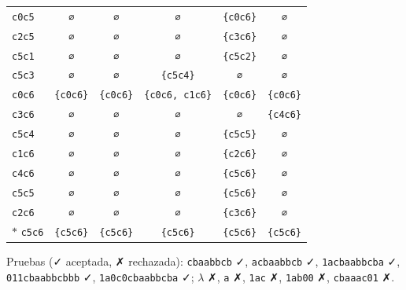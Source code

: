 \documentclass[11pt]{article}
\begin{document}
\begin{center}
\begin{tabular}{lccccc}
 \texttt{c0c5} & \texttt{∅} & \texttt{∅} & \texttt{∅} & \texttt{\{c0c6\}} & \texttt{∅} \\
 \texttt{c2c5} & \texttt{∅} & \texttt{∅} & \texttt{∅} & \texttt{\{c3c6\}} & \texttt{∅} \\
 \texttt{c5c1} & \texttt{∅} & \texttt{∅} & \texttt{∅} & \texttt{\{c5c2\}} & \texttt{∅} \\
 \texttt{c5c3} & \texttt{∅} & \texttt{∅} & \texttt{\{c5c4\}} & \texttt{∅} & \texttt{∅} \\
 \texttt{c0c6} & \texttt{\{c0c6\}} & \texttt{\{c0c6\}} & \texttt{\{c0c6, c1c6\}} & \texttt{\{c0c6\}} & \texttt{\{c0c6\}} \\
 \texttt{c3c6} & \texttt{∅} & \texttt{∅} & \texttt{∅} & \texttt{∅} & \texttt{\{c4c6\}} \\
 \texttt{c5c4} & \texttt{∅} & \texttt{∅} & \texttt{∅} & \texttt{\{c5c5\}} & \texttt{∅} \\
 \texttt{c1c6} & \texttt{∅} & \texttt{∅} & \texttt{∅} & \texttt{\{c2c6\}} & \texttt{∅} \\
 \texttt{c4c6} & \texttt{∅} & \texttt{∅} & \texttt{∅} & \texttt{\{c5c6\}} & \texttt{∅} \\
 \texttt{c5c5} & \texttt{∅} & \texttt{∅} & \texttt{∅} & \texttt{\{c5c6\}} & \texttt{∅} \\
 \texttt{c2c6} & \texttt{∅} & \texttt{∅} & \texttt{∅} & \texttt{\{c3c6\}} & \texttt{∅} \\
$*$ \texttt{c5c6} & \texttt{\{c5c6\}} & \texttt{\{c5c6\}} & \texttt{\{c5c6\}} & \texttt{\{c5c6\}} & \texttt{\{c5c6\}} \\
\bottomrule\end{tabular}\end{center}
Pruebas (✓ aceptada, ✗ rechazada): \texttt{cbaabbcb} ✓, \texttt{acbaabbcb} ✓, \texttt{1acbaabbcba} ✓, \texttt{011cbaabbcbbb} ✓, \texttt{1a0c0cbaabbcba} ✓; $\lambda$ ✗, \texttt{a} ✗, \texttt{1ac} ✗, \texttt{1ab00} ✗, \texttt{cbaaac01} ✗.
\end{document}
